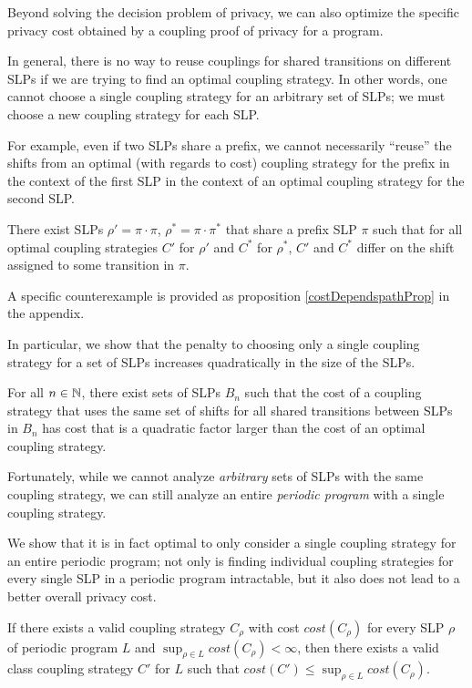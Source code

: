 
Beyond solving the decision problem of privacy, we can also optimize the specific privacy cost obtained by a coupling proof of privacy for a program. 

In general, there is no way to reuse couplings for shared transitions on different SLPs if we are trying to find an optimal coupling strategy. In other words, one cannot choose a single coupling strategy for an arbitrary set of SLPs; we must choose a new coupling strategy for each SLP.

For example, even if two SLPs share a prefix, we cannot necessarily ``reuse'' the shifts from an optimal (with regards to cost) coupling strategy for the prefix in the context of the first SLP in the context of an optimal coupling strategy for the second SLP. 

\begin{prop}\label{noSharingStrategiesProp}
  There exist SLPs $\rho'=\pi\cdot \pi$, $\rho^*=\pi\cdot\pi^*$ that share a prefix SLP $\pi$ such that for all optimal coupling strategies $C'$ for $\rho'$ and $C^*$ for $\rho^*$, $C'$ and $C^*$ differ on the shift assigned to some transition in $\pi$. 
\end{prop}

A specific counterexample is provided as proposition \ref{costDependspathProp} in the appendix. 

In particular, we show that the penalty to choosing only a single coupling strategy for a set of SLPs increases quadratically in the size of the SLPs.

\begin{prop}\label{quadraticPenaltyProp}
  For all $n\in \mathbb{N}$, there exist sets of SLPs $B_n$ such that the cost of a coupling strategy that uses the same set of shifts for all shared transitions between SLPs in $B_n$ has cost that is a quadratic factor larger than the cost of an optimal coupling strategy. 
\end{prop}

Fortunately, while we cannot analyze \textit{arbitrary} sets of SLPs with the same coupling strategy, we can still analyze an entire \textit{periodic program} with a single coupling strategy.

We show that it is in fact optimal to only consider a single coupling strategy for an entire periodic program; not only is finding individual coupling strategies for every single SLP in a periodic program intractable, but it also does not lead to a better overall privacy cost. 

\begin{prop}\label{ClassCouplingStrategiesAreEnoughProp}
    If there exists a valid coupling strategy $C_\rho$ with cost $cost(C_\rho)$ for every SLP $\rho$ of periodic program $L$ and $\sup_{\rho\in L}cost(C_\rho)< \infty$, then there exists a valid class coupling strategy $C'$ for $L$ such that $cost(C') \leq \sup_{\rho\in L}cost(C_\rho)$. 
\end{prop}

